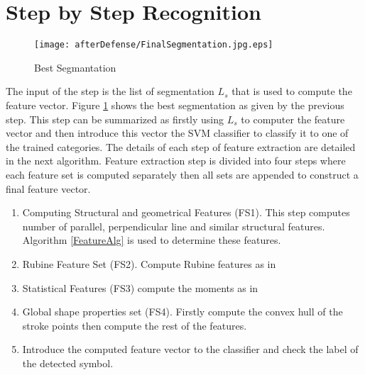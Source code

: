 \section{Step by Step Recognition}
\label{apsec:steprec}

\begin{figure}
	\centering
		\texttt{[image: afterDefense/FinalSegmentation.jpg.eps]}
	\caption{Best Segmantation }
	\label{fig:segmentatiofinal.jpg}
\end{figure}


	The input of the step is the list of segmentation $L_s$ that is used to compute the feature vector. Figure \ref{fig:segmentatiofinal.jpg} shows the best segmentation as given by the previous step. This step can be summarized as firstly using $L_s$ to computer the feature vector and then introduce this vector the SVM classifier to classify it to one of the trained categories. The details of each step of feature extraction are detailed in the next algorithm. Feature extraction step is divided into four steps where each feature set is computed separately then all sets are appended to construct a final feature vector. 
	
\begin{enumerate}
	\item Computing Structural and geometrical Features (FS1). This step computes number of parallel, perpendicular line and similar structural features. Algorithm \ref{FeatureAlg} is used to determine these features.
	\item Rubine Feature Set (FS2).  Compute Rubine features as in \cite{gestureexample12} 
	\item Statistical Features (FS3) compute the moments as in \cite{zernike61}
	\item Global shape properties set (FS4). Firstly compute the convex hull of the stroke points then compute the rest of the features. 
	
	\item Introduce the computed feature vector to the classifier and check the label of the detected symbol. 
\end{enumerate}


